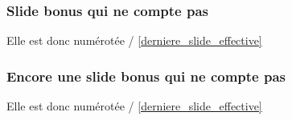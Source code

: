 \begin{frame}[fragile]
\frametitle{Slide bonus qui ne compte pas}
Elle est donc numérotée \theframenumber / \ref{derniere_slide_effective}
\end{frame}


\begin{frame}[fragile]
\frametitle{Encore une slide bonus qui ne compte pas}
Elle est donc numérotée \theframenumber / \ref{derniere_slide_effective}
\end{frame}
\addtocounter{framenumber}{-2} 


